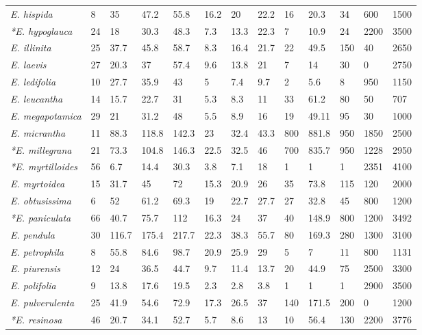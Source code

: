 \documentclass[fleqn,10pt,lineno]{wlpeerj} %
\begin{document}
\begin{table}[hbt]
\begin{center}
\begin{tabular}{lllllllllllll}
\emph{E. hispida} & 8 & 35 & 47.2 & 55.8 & 16.2 & 20 & 22.2 & 16 & 20.3 & 34 & 600 & 1500\\
\emph{*E. hypoglauca} & 24 & 18 & 30.3 & 48.3 & 7.3 & 13.3 & 22.3 & 7 & 10.9 & 24 & 2200 & 3500\\
\emph{E. illinita} & 25 & 37.7 & 45.8 & 58.7 & 8.3 & 16.4 & 21.7 & 22 & 49.5 & 150 & 40 & 2650\\
\emph{E. laevis} & 27 & 20.3 & 37 & 57.4 & 9.6 & 13.8 & 21 & 7 & 14 & 30 & 0 & 2750\\
\emph{E. ledifolia} & 10 & 27.7 & 35.9 & 43 & 5 & 7.4 & 9.7 & 2 & 5.6 & 8 & 950 & 1150\\
\emph{E. leucantha} & 14 & 15.7 & 22.7 & 31 & 5.3 & 8.3 & 11 & 33 & 61.2 & 80 & 50 & 707\\
\emph{E. megapotamica} & 29 & 21 & 31.2 & 48 & 5.5 & 8.9 & 16 & 19 & 49.11 & 95 & 30 & 1000\\
\emph{E. micrantha} & 11 & 88.3 & 118.8 & 142.3 & 23 & 32.4 & 43.3 & 800 & 881.8 & 950 & 1850 & 2500\\
\emph{*E. millegrana} & 21 & 73.3 & 104.8 & 146.3 & 22.5 & 32.5 & 46 & 700 & 835.7 & 950 & 1228 & 2950\\
\emph{*E. myrtilloides} & 56 & 6.7 & 14.4 & 30.3 & 3.8 & 7.1 & 18 & 1 & 1 & 1 & 2351 & 4100\\
\emph{E. myrtoidea} & 15 & 31.7 & 45 & 72 & 15.3 & 20.9 & 26 & 35 & 73.8 & 115 & 120 & 2000\\
\emph{E. obtusissima} & 6 & 52 & 61.2 & 69.3 & 19 & 22.7 & 27.7 & 27 & 32.8 & 45 & 800 & 1200\\
\emph{*E. paniculata} & 66 & 40.7 & 75.7 & 112 & 16.3 & 24 & 37 & 40 & 148.9 & 800 & 1200 & 3492\\
\emph{E. pendula} & 30 & 116.7 & 175.4 & 217.7 & 22.3 & 38.3 & 55.7 & 80 & 169.3 & 280 & 1300 & 3100\\
\emph{E. petrophila} & 8 & 55.8 & 84.6 & 98.7 & 20.9 & 25.9 & 29 & 5 & 7 & 11 & 800 & 1131\\
\emph{E. piurensis} & 12 & 24 & 36.5 & 44.7 & 9.7 & 11.4 & 13.7 & 20 & 44.9 & 75 & 2500 & 3300\\
\emph{E. polifolia} & 9 & 13.8 & 17.6 & 19.5 & 2.3 & 2.8 & 3.8 & 1 & 1 & 1 & 2900 & 3500\\
\emph{E. pulverulenta} & 25 & 41.9 & 54.6 & 72.9 & 17.3 & 26.5 & 37 & 140 & 171.5 & 200 & 0 & 1200\\
\emph{*E. resinosa} & 46 & 20.7 & 34.1 & 52.7 & 5.7 & 8.6 & 13 & 10 & 56.4 & 130 & 2200 & 3776\\

\end{tabular}
\end{center}
\end{table}
\end{document}
